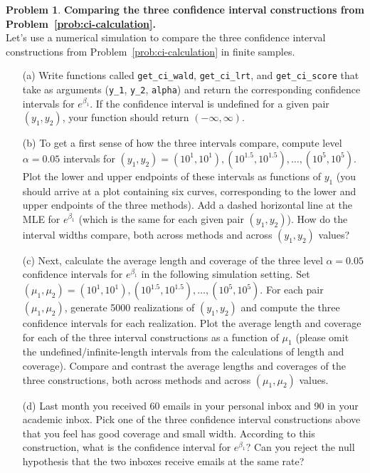 \documentclass[11pt,letterpaper,english,oneside]{article}\usepackage[]{graphicx}\usepackage[]{color}
\theoremstyle{definition} %
\newtheorem{problem}{Problem}
\newenvironment{prob}{\clearpage \begin{problem}\hspace{0pt}}{\end{problem}}
\begin{document}
\begin{prob} \label{prob:ci-simulation}\textbf{Comparing the three confidence interval constructions from Problem~\ref{prob:ci-calculation}.} \\

\noindent Let's use a numerical simulation to compare the three confidence interval constructions from Problem~\ref{prob:ci-calculation} in finite samples.

\begin{enumerate}

\item[(a)] Write functions called \verb|get_ci_wald|, \verb|get_ci_lrt|, and \verb|get_ci_score| that take as arguments (\verb|y_1|, \verb|y_2|, \verb|alpha|) and return the corresponding confidence intervals for $e^{\beta_1}$. If the confidence interval is undefined for a given pair $(y_1, y_2)$, your function should return $(-\infty, \infty)$.

\item[(b)] To get a first sense of how the three intervals compare, compute level $\alpha = 0.05$ intervals for $(y_1, y_2) = (10^1, 10^1), (10^{1.5}, 10^{1.5}), \dots, (10^5, 10^5)$. Plot the lower and upper endpoints of these intervals as functions of $y_1$ (you should arrive at a plot containing six curves, corresponding to the lower and upper endpoints of the three methods). Add a dashed horizontal line at the MLE for $e^{\beta_1}$ (which is the same for each given pair $(y_1, y_2)$). How do the interval widths compare, both across methods and across $(y_1, y_2)$ values?

\item[(c)] Next, calculate the average length and coverage of the three level $\alpha = 0.05$ confidence intervals for $e^{\beta_1}$ in the following simulation setting. Set $(\mu_1, \mu_2) = (10^1, 10^1), (10^{1.5}, 10^{1.5}), \dots, (10^5, 10^5)$. For each pair $(\mu_1, \mu_2)$, generate 5000 realizations of $(y_1, y_2)$ and compute the three confidence intervals for each realization. Plot the average length and coverage for each of the three interval constructions as a function of $\mu_1$ (please omit the undefined/infinite-length intervals from the calculations of length and coverage). Compare and contrast the average lengths and coverages of the three constructions, both across methods and across $(\mu_1, \mu_2)$ values.

\item[(d)] Last month you received 60 emails in your personal inbox and 90 in your academic inbox. Pick one of the three confidence interval constructions above that you feel has good coverage and small width. According to this construction, what is the confidence interval for $e^{\beta_1}$? Can you reject the null hypothesis that the two inboxes receive emails at the same rate?
\end{enumerate}


\end{prob}
\end{document}
